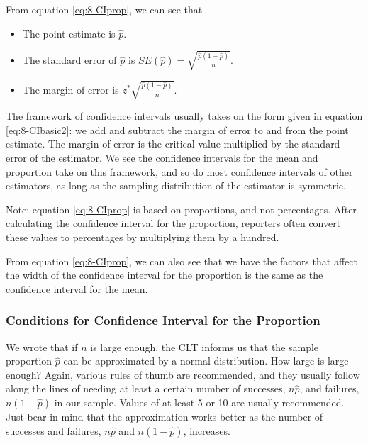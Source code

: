 \documentclass[
]{book}
\providecommand{\tightlist}{%
  \setlength{\itemsep}{0pt}\setlength{\parskip}{0pt}}
\begin{document}
From equation \eqref{eq:8-CIprop}, we can see that

\begin{itemize}
\tightlist
\item
  The point estimate is \(\hat{p}\).
\item
  The standard error of \(\hat{p}\) is \(SE(\hat{p}) = \sqrt{\frac{\hat{p}(1-\hat{p})}{n}}\).
\item
  The margin of error is \(z^{*} \sqrt{\frac{\hat{p}(1-\hat{p})}{n}}\).
\end{itemize}

The framework of confidence intervals usually takes on the form given in equation \eqref{eq:8-CIbasic2}: we add and subtract the margin of error to and from the point estimate. The margin of error is the critical value multiplied by the standard error of the estimator. We see the confidence intervals for the mean and proportion take on this framework, and so do most confidence intervals of other estimators, as long as the sampling distribution of the estimator is symmetric.

Note: equation \eqref{eq:8-CIprop} is based on proportions, and not percentages. After calculating the confidence interval for the proportion, reporters often convert these values to percentages by multiplying them by a hundred.

From equation \eqref{eq:8-CIprop}, we can also see that we have the factors that affect the width of the confidence interval for the proportion is the same as the confidence interval for the mean.

\hypertarget{conditions-for-confidence-interval-for-the-proportion}{%
\subsubsection{Conditions for Confidence Interval for the Proportion}\label{conditions-for-confidence-interval-for-the-proportion}}

We wrote that if \(n\) is large enough, the CLT informs us that the sample proportion \(\hat{p}\) can be approximated by a normal distribution. How large is large enough? Again, various rules of thumb are recommended, and they usually follow along the lines of needing at least a certain number of successes, \(n\hat{p}\), and failures, \(n(1-\hat{p})\) in our sample. Values of at least 5 or 10 are usually recommended. Just bear in mind that the approximation works better as the number of successes and failures, \(n\hat{p}\) and \(n(1-\hat{p})\), increases.
\end{document}
